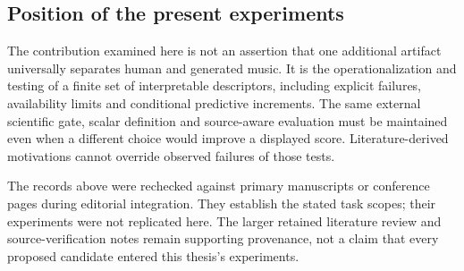 \subsection{Position of the present experiments}
The contribution examined here is not an assertion that one additional
artifact universally separates human and generated music. It is the
operationalization and testing of a finite set of interpretable descriptors,
including explicit failures, availability limits and conditional predictive
increments. The same external scientific gate, scalar definition and
source-aware evaluation must be maintained even when a different choice
would improve a displayed score. Literature-derived motivations cannot
override observed failures of those tests.

The records above were rechecked against primary manuscripts or conference
pages during editorial integration. They establish the stated task scopes;
their experiments were not replicated here. The larger retained literature
review and source-verification notes remain supporting provenance, not a
claim that every proposed candidate entered this thesis's experiments.
